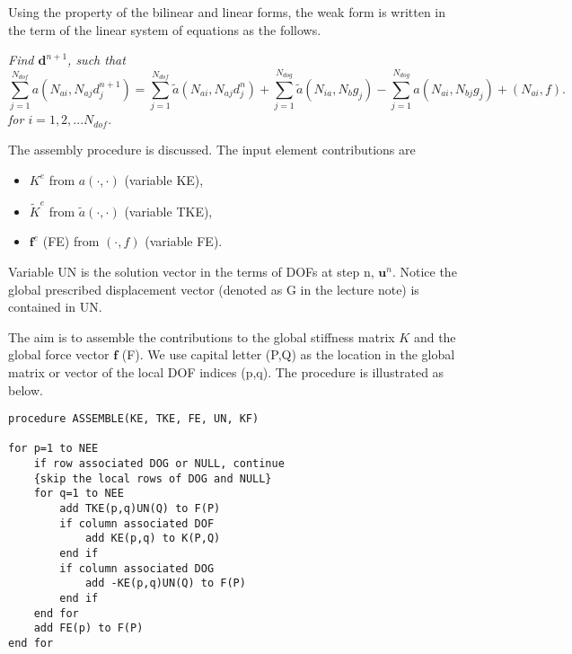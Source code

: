 \documentclass[11pt]{article}  %
\begin{document}
Using the property of the bilinear and linear forms, the weak form is written in the term of the linear system of equations as the follows.

 \textit{Find $\mathbf{d}^{n+1}$, such that
 \begin{equation}
 \sum_{j=1}^{N_{dof}}  a(N_{ai}, N_{aj} d_{j}^{n+1}) = \sum_{j=1}^{N_{dof}}  \tilde{a}(N_{ai}, N_{aj} d_{j}^{n})  + \sum_{j=1}^{N_{dog}}  \tilde{a}(N_{ia}, N_{b} g_j) - \sum_{j=1}^{N_{dog}} a(N_{ai},  N_{bj} g_j )+ (N_{ai},f).
 \end{equation}
 for  $i=1,2,...N_{dof}$. }
 
 The assembly procedure is discussed. The input element contributions are
 \begin{itemize}
 \item $K^e$  from $a(\cdot, \cdot)$ (variable KE),
 \item $\tilde{K}^e$  from  $\tilde{a}(\cdot, \cdot)$  (variable TKE),
 \item $\mathbf{f}^e$ (FE) from  $(\cdot, f)$ (variable FE).
 \end{itemize}
Variable UN is the solution vector in the terms of DOFs at step n, $\mathbf{u}^n$. 
Notice the global prescribed displacement vector (denoted as G in the lecture note) is contained in UN.
 
 The aim is to assemble the contributions to the global stiffness matrix $K$ and the global force vector $\mathbf{f}$ (F). We use capital letter (P,Q) as the location in the global matrix or vector of the local DOF indices (p,q). 
 The procedure is illustrated as below.
\begin{samepage}
\begin{verbatim}
procedure ASSEMBLE(KE, TKE, FE, UN, KF)

for p=1 to NEE
    if row associated DOG or NULL, continue
    {skip the local rows of DOG and NULL}
    for q=1 to NEE
        add TKE(p,q)UN(Q) to F(P)
        if column associated DOF
            add KE(p,q) to K(P,Q)  
        end if
        if column associated DOG 
            add -KE(p,q)UN(Q) to F(P)
        end if
    end for
    add FE(p) to F(P)
end for
\end{verbatim}
\end{samepage}
\end{document}
